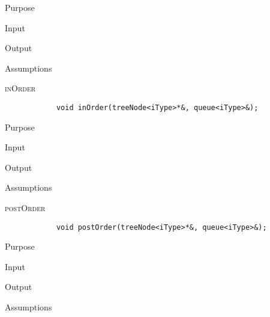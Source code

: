 \documentclass[pdftex, 12pt]{article}
\begin{document}
\begin{description}
\begin{description}
			\item{Purpose}

			\item{Input}

			\item{Output}

			\item{Assumptions}

		\end{description}
	\item{\textsc{inOrder}}
		\begin{lstlisting}
			void inOrder(treeNode<iType>*&, queue<iType>&);
		\end{lstlisting}
		\begin{description}

			\item{Purpose}

			\item{Input}

			\item{Output}

			\item{Assumptions}

		\end{description}
	\item{\textsc{postOrder}}
		\begin{lstlisting}
			void postOrder(treeNode<iType>*&, queue<iType>&);
		\end{lstlisting}
		\begin{description}

			\item{Purpose}

			\item{Input}

			\item{Output}

			\item{Assumptions}

		\end{description}

\end{description}
\end{document}
